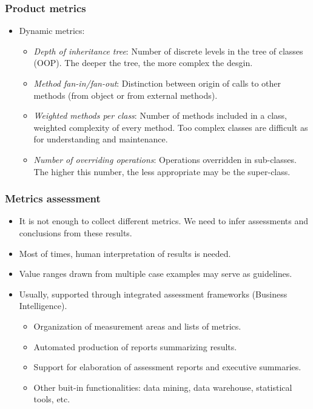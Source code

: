 \documentclass{beamer}
\begin{document}

\begin{frame}
 \frametitle{Product metrics}
 \begin{itemize}
 \item Dynamic metrics:
 \begin{itemize}
  \item \textit{Depth of inheritance tree}: Number of discrete levels in the tree of
classes (OOP). The deeper the tree, the more complex the desgin.
  \item \textit{Method fan-in/fan-out}: Distinction between origin of calls to other
methods (from object or from external methods).
  \item \textit{Weighted methods per class}: Number of methods included in a class, weighted complexity
of every method. Too complex classes are difficult as for understanding and maintenance.
  \item \textit{Number of overriding operations}: Operations overridden in sub-classes. The higher this
number, the less appropriate may be the super-class.
 \end{itemize}

 \end{itemize}
\end{frame}


\begin{frame}
 \frametitle{Metrics assessment}
 \begin{itemize}
 \item It is not enough to collect different metrics. We need to infer assessments and
conclusions from these results.
 \item Most of times, human interpretation of results is needed. 
 \item Value ranges drawn from multiple case examples may serve as guidelines.
 \item Usually, supported through integrated assessment frameworks (Business Intelligence).
  \begin{itemize}
   \item Organization of measurement areas and lists of metrics.
   \item Automated production of reports summarizing results.
   \item Support for elaboration of assessment reports and executive summaries.
   \item Other buit-in functionalities: data mining, data warehouse, statistical tools, etc.
  \end{itemize}

 \end{itemize}

\end{frame}
\end{document}
